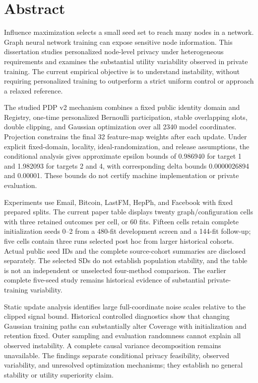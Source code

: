 \chapter*{Abstract}
Influence maximization selects a small seed set to reach many nodes in a network. Graph neural network training can expose sensitive node information. This dissertation studies personalized node-level privacy under heterogeneous requirements and examines the substantial utility variability observed in private training. The current empirical objective is to understand instability, without requiring personalized training to outperform a strict uniform control or approach a relaxed reference.

The studied PDP v2 mechanism combines a fixed public identity domain and Registry, one-time personalized Bernoulli participation, stable overlapping slots, double clipping, and Gaussian optimization over all 2340 model coordinates. Projection constrains the final 32 feature-map weights after each update. Under explicit fixed-domain, locality, ideal-randomization, and release assumptions, the conditional analysis gives approximate epsilon bounds of 0.986940 for target 1 and 1.982093 for targets 2 and 4, with corresponding delta bounds 0.0000026894 and 0.00001. These bounds do not certify machine implementation or private evaluation.

Experiments use Email, Bitcoin, LastFM, HepPh, and Facebook with fixed prepared splits. The current paper table displays twenty graph/configuration cells with three retained outcomes per cell, or 60 fits. Fifteen cells retain complete initialization seeds 0--2 from a 480-fit development screen and a 144-fit follow-up; five cells contain three runs selected post hoc from larger historical cohorts. Actual public seed IDs and the complete source-cohort summaries are disclosed separately. The selected SDs do not establish population stability, and the table is not an independent or unselected four-method comparison. The earlier complete five-seed study remains historical evidence of substantial private-training variability.

Static update analysis identifies large full-coordinate noise scales relative to the clipped signal bound. Historical controlled diagnostics show that changing Gaussian training paths can substantially alter Coverage with initialization and retention fixed. Outer sampling and evaluation randomness cannot explain all observed instability. A complete causal variance decomposition remains unavailable. The findings separate conditional privacy feasibility, observed variability, and unresolved optimization mechanisms; they establish no general stability or utility superiority claim.
\clearpage
